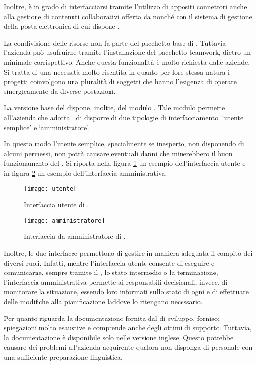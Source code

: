 Inoltre, \progname è in grado di interfacciarsi tramite l'utilizzo di appositi connettori anche alla gestione di contenuti collaborativi offerta da  nonché con il sistema di gestione della posta elettronica  di cui dispone \customer.

La condivisione delle risorse non fa parte del pacchetto base di \progname. Tuttavia l'azienda può usufruirne tramite l'installazione del pacchetto \textsf{teamwork}, dietro un minimale corrispettivo. Anche questa funzionalità è molto richiesta dalle aziende. Si tratta di una necessità molto risentita in quanto per loro stessa natura i progetti coinvolgono una pluralità di soggetti che hanno l'esigenza di  operare sinergicamente da diverse postazioni.

La versione base del \sw dispone, inoltre, del modulo . Tale modulo permette all'azienda che adotta \progname, di disporre di due tipologie di interfacciamento: `utente semplice' e `amministratore'.

In questo modo l'utente semplice, specialmente se inesperto, non disponendo di alcuni permessi, non potrà causare eventuali danni che minerebbero il buon funzionamento del \sw. Si riporta nella figura \ref{fig:utente} un esempio dell'interfaccia utente e in figura \ref{fig:amministratore} un esempio dell'interfaccia amministrativa.


\begin{figure}[H]
  \centering
  \texttt{[image: utente]}
  \caption{Interfaccia utente di \progname.}
  \label{fig:utente}
\end{figure}

\begin{figure}[H]
  \centering
  \texttt{[image: amministratore]}
  \caption{Interfaccia da amministratore di \progname.}
  \label{fig:amministratore}
\end{figure}

Inoltre, le due interfacce permettono di gestire in maniera adeguata il compito dei diversi ruoli. Infatti, mentre l'interfaccia utente consente di eseguire  e comunicarne, sempre tramite il \sw, lo stato intermedio o la terminazione, l'interfaccia amministrativa permette ai responsabili decisionali, invece, di monitorare la situazione, essendo loro informati sullo stato di ogni  e di effettuare delle modifiche alla pianificazione laddove lo ritengano necessario.

Per quanto riguarda la documentazione fornita dal  di sviluppo, fornisce spiegazioni molto esaustive e comprende anche degli ottimi  di supporto. 
Tuttavia, la documentazione è disponibile solo nelle versione inglese. Questo potrebbe causare dei problemi all'azienda acquirente qualora non disponga di personale con una sufficiente preparazione linguistica.

